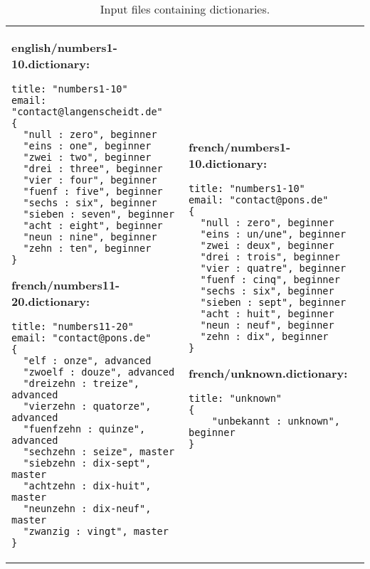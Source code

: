 \begin{table}
\begin{tabular}{p{6cm} p{6cm} }
\footnotesize
\textbf{english/numbers1-10.dictionary:}
\begin{verbatim}
title: "numbers1-10"
email: "contact@langenscheidt.de"	
{
  "null : zero", beginner
  "eins : one", beginner
  "zwei : two", beginner
  "drei : three", beginner
  "vier : four", beginner
  "fuenf : five", beginner
  "sechs : six", beginner
  "sieben : seven", beginner
  "acht : eight", beginner
  "neun : nine", beginner
  "zehn : ten", beginner 
}
\end{verbatim} 

\footnotesize
\textbf{french/numbers11-20.dictionary:}
\begin{verbatim}
title: "numbers11-20"
email: "contact@pons.de"	
{
  "elf : onze", advanced
  "zwoelf : douze", advanced
  "dreizehn : treize", advanced
  "vierzehn : quatorze", advanced
  "fuenfzehn : quinze", advanced
  "sechzehn : seize", master
  "siebzehn : dix-sept", master
  "achtzehn : dix-huit", master
  "neunzehn : dix-neuf", master
  "zwanzig : vingt", master
}
\end{verbatim}
&

\footnotesize
\textbf{french/numbers1-10.dictionary:}
\begin{verbatim}   
title: "numbers1-10"
email: "contact@pons.de"	
{
  "null : zero", beginner
  "eins : un/une", beginner
  "zwei : deux", beginner
  "drei : trois", beginner
  "vier : quatre", beginner
  "fuenf : cinq", beginner
  "sechs : six", beginner
  "sieben : sept", beginner
  "acht : huit", beginner
  "neun : neuf", beginner
  "zehn : dix", beginner 
}
\end{verbatim}

\footnotesize
\textbf{french/unknown.dictionary:}
\begin{verbatim}
title: "unknown"
{
	"unbekannt : unknown", beginner
}
\end{verbatim}
  \\
\end{tabular}   
\caption{Input files containing dictionaries.}
\label{moca-inputdata}

\end{table}   

